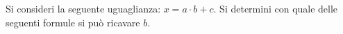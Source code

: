 Si consideri la seguente uguaglianza: 
$x = a \cdot b + c$.
Si determini con quale delle seguenti formule si può 
ricavare $b$.